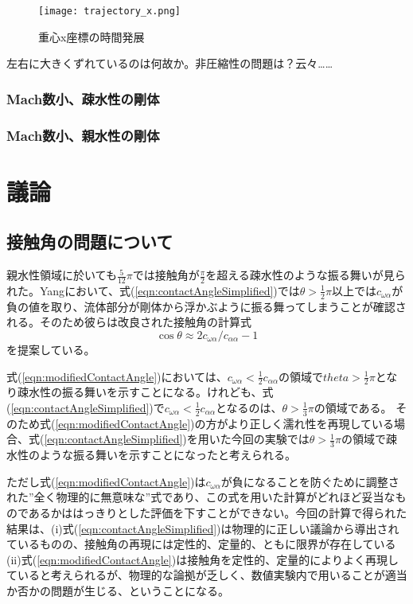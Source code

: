 \documentclass[]{jsarticle}
\begin{document}
\begin{figure}[H]
  \centering
  \texttt{[image: trajectory\_x.png]}
  \caption{重心x座標の時間発展}
  \label{fig:trajectory}
\end{figure}


左右に大きくずれているのは何故か。非圧縮性の問題は？云々……

\subsubsection{Mach数小、疎水性の剛体}
\subsubsection{Mach数小、親水性の剛体}
\newpage

\section{議論}
\subsection{接触角の問題について}
\label{subsec:discContact}
親水性領域に於いても$\frac{5}{12}\pi$では接触角が$\frac{\pi}{2}$を超える疎水性のような振る舞いが見られた。Yang\cite{Yang2017}において、式(\ref{eqn:contactAngleSimplified})では$\theta>\frac{1}{2}\pi$以上では$c_{\omega\alpha}$が負の値を取り、流体部分が剛体から浮かぶように振る舞ってしまうことが確認される。そのため彼らは改良された接触角の計算式
\begin{equation}
  \label{eqn:modifiedContactAngle}
\cos \theta \approx 2c_{\omega\alpha}/c_{\alpha\alpha} -1
\end{equation}
を提案している。

式(\ref{eqn:modifiedContactAngle})においては、$c_{\omega\alpha}<\frac{1}{2}c_{\alpha\alpha}$の領域で$theta>\frac{1}{2}\pi$となり疎水性の振る舞いを示すことになる。けれども、式(\ref{eqn:contactAngleSimplified})で$c_{\omega\alpha}<\frac{1}{2}c_{\alpha\alpha}$となるのは、$\theta>\frac{1}{3}\pi$の領域である。
そのため式(\ref{eqn:modifiedContactAngle})の方がより正しく濡れ性を再現している場合、式(\ref{eqn:contactAngleSimplified})を用いた今回の実験では$\theta>\frac{1}{3}\pi$の領域で疎水性のような振る舞いを示すことになったと考えられる。

ただし式(\ref{eqn:modifiedContactAngle})は$c_{\omega\alpha}$が負になることを防ぐために調整された”全く物理的に無意味な”式であり、この式を用いた計算がどれほど妥当なものであるかははっきりとした評価を下すことができない。今回の計算で得られた結果は、(i)式(\ref{eqn:contactAngleSimplified})は物理的に正しい議論から導出されているものの、接触角の再現には定性的、定量的、ともに限界が存在している(ii)式(\ref{eqn:modifiedContactAngle})は接触角を定性的、定量的によりよく再現していると考えられるが、物理的な論拠が乏しく、数値実験内で用いることが適当か否かの問題が生じる、ということになる。
\end{document}
